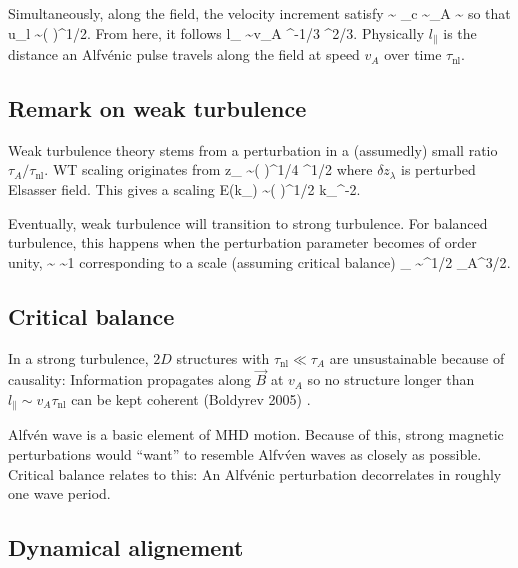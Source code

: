 \documentclass[usenatbib,twocolumn, twocolappendix]{aastex63}
\begin{document}
Simultaneously, along the field, the velocity increment satisfy
\be
{} \sim \epsilon \quad{}\quad
\tau_c \sim \tau_A \sim {}
\ee
so that
\be
\delta u_{l \parallel} \sim \left(  \right)^{1/2}.
\ee
From here, it follows
\be
l_{\parallel} \sim v_A \epsilon^{-1/3} \lambda^{2/3}.
\ee
Physically $l_{\parallel}$ is the distance an Alfv\'enic pulse travels along the field at speed $v_A$ over time $\tau_{\mathrm{nl}}$.


\subsection{Remark on weak turbulence}


Weak turbulence theory stems from a perturbation in a (assumedly) small ratio $\tau_A/\tau_{\mathrm{nl}}$.
WT scaling originates from
\be
\delta z_{\lambda} \sim \left(  \right)^{1/4} \lambda^{1/2}
\ee
where $\delta z_{\lambda}$ is perturbed Elsasser field.
This gives a scaling
\be
E(k_{\perp}) \sim \left(  \right)^{1/2} k_{\perp}^{-2}.
\ee

Eventually, weak turbulence will transition to strong turbulence.
For balanced turbulence, this happens when the perturbation parameter becomes of order unity,
\be
{} \sim {} \sim 1
\ee
corresponding to a scale (assuming critical balance)
\be
\lambda_{} \sim \epsilon^{1/2} \tau_A^{3/2}.
\ee


\subsection{Critical balance}

In a strong turbulence, $2D$ structures with $\tau_{\mathrm{nl}} \ll \tau_A$ are unsustainable because of causality:
Information propagates along $\vec{B}$ at $v_A$ so no structure longer than $l_{\parallel} \sim v_A \tau_{\mathrm{nl}}$ can be kept coherent (Boldyrev 2005) \citep{Boldyrev_2005}.


Alfv\'en wave is a basic element of MHD motion.
Because of this, strong magnetic perturbations would ``want'' to resemble Alfv\'ven waves as closely as possible.
Critical balance relates to this:
An Alfv\'enic perturbation decorrelates in roughly one wave period.

\subsection{Dynamical alignement}
\end{document}

